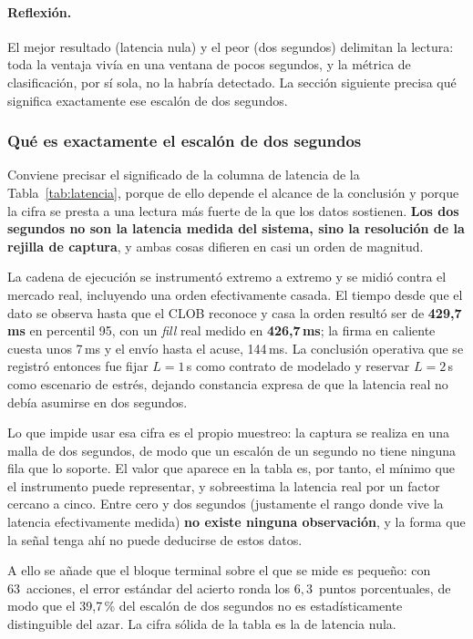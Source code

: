 \paragraph{Reflexión.} El mejor resultado (latencia nula) y el peor (dos segundos) delimitan
la lectura: toda la ventaja vivía en una ventana de pocos segundos, y la métrica de
clasificación, por sí sola, no la habría detectado. La sección siguiente precisa qué
significa exactamente ese escalón de dos segundos.

\subsubsection{Qué es exactamente el escalón de dos segundos}
\label{sec::latencia_grid}

Conviene precisar el significado de la columna de latencia de la
Tabla~\ref{tab:latencia}, porque de ello depende el alcance de la conclusión y porque la cifra se presta a una lectura más fuerte de la que los datos
sostienen. \textbf{Los dos segundos no son la latencia medida del sistema, sino la
resolución de la rejilla de captura}, y ambas cosas difieren en casi un orden de magnitud.

La cadena de ejecución se instrumentó extremo a extremo y se midió contra el mercado real,
incluyendo una orden efectivamente casada. El tiempo desde que el dato se observa hasta que
el CLOB reconoce y casa la orden resultó ser de \textbf{429{,}7\,ms} en percentil 95, con un
\emph{fill} real medido en \textbf{426{,}7\,ms}; la firma en caliente cuesta unos 7\,ms y el
envío hasta el acuse, 144\,ms. La conclusión operativa que se registró entonces fue fijar
$L=1$\,s como contrato de modelado y reservar $L=2$\,s como escenario de estrés, dejando
constancia expresa de que la latencia real no debía asumirse en dos segundos.

Lo que impide usar esa cifra es el propio muestreo: la captura se realiza en una malla de
dos segundos, de modo que un escalón de un segundo no tiene ninguna fila que lo soporte.
El valor que aparece en la tabla es, por tanto, el mínimo que el instrumento puede
representar, y sobreestima la latencia real por un factor cercano a cinco. Entre cero y dos
segundos (justamente el rango donde vive la latencia efectivamente medida) \textbf{no existe
ninguna observación}, y la forma que la señal tenga ahí no puede deducirse de estos datos.

A ello se añade que el bloque terminal sobre el que se mide es pequeño: con 63~acciones, el
error estándar del acierto ronda los $6{,}3$~puntos porcentuales, de modo que el 39,7\,\% del
escalón de dos segundos no es estadísticamente distinguible del azar. La cifra sólida de la
tabla es la de latencia nula.


